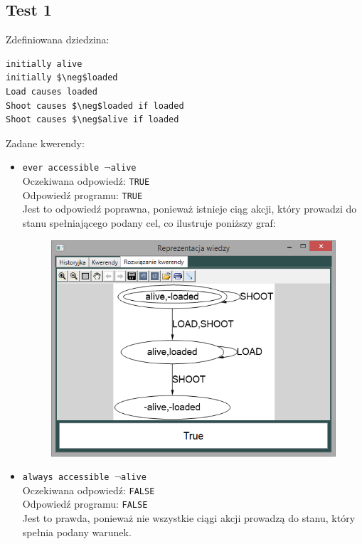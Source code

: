 \documentclass{article}
\begin{document}
\subsection{Test 1}
Zdefiniowana dziedzina:
\bigskip
{}
\begin{lstlisting}[mathescape=true]
initially alive
initially $\neg$loaded
Load causes loaded
Shoot causes $\neg$loaded if loaded
Shoot causes $\neg$alive if loaded
\end{lstlisting}
\vspace{1cm}
Zadane kwerendy:
\begin{itemize}
    \item {\large\texttt{ever accessible $\neg$alive}}\\
    Oczekiwana odpowiedź: \texttt{TRUE}\\
    Odpowiedź programu: \texttt{TRUE}\\
    Jest to odpowiedź poprawna, ponieważ istnieje ciąg akcji, który prowadzi do stanu spełniającego podany cel, co ilustruje poniższy graf:
    \begin{figure}[H]
    \centering
    \includegraphics[scale=0.5]{test1_1}
    \end{figure}
    \item {\large\texttt{always accessible $\neg$alive}}\\
    Oczekiwana odpowiedź: \texttt{FALSE}\\
    Odpowiedź programu: \texttt{FALSE}\\
    Jest to prawda, ponieważ nie wszystkie ciągi akcji prowadzą do stanu, który spełnia podany warunek.

\end{itemize}
\end{document}
